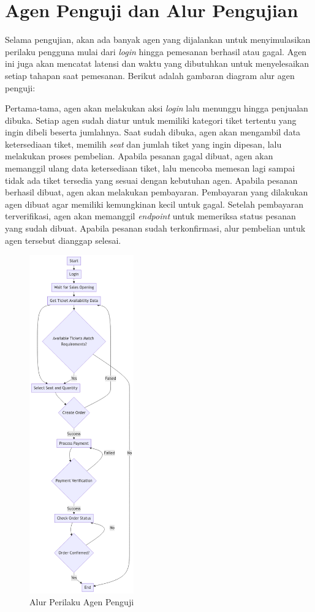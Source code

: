 \section{Agen Penguji dan Alur Pengujian}

Selama pengujian, akan ada banyak agen yang dijalankan untuk menyimulasikan perilaku pengguna mulai dari \textit{login} hingga pemesanan berhasil atau gagal. Agen ini juga akan mencatat latensi dan waktu yang dibutuhkan untuk menyelesaikan setiap tahapan saat pemesanan. Berikut adalah gambaran diagram alur agen penguji:

Pertama-tama, agen akan melakukan aksi \textit{login} lalu menunggu hingga penjualan dibuka. Setiap agen sudah diatur untuk memiliki kategori tiket tertentu yang ingin dibeli beserta jumlahnya. Saat sudah dibuka, agen akan mengambil data ketersediaan tiket, memilih \textit{seat} dan jumlah tiket yang ingin dipesan, lalu melakukan proses pembelian. Apabila pesanan gagal dibuat, agen akan memanggil ulang data ketersediaan tiket, lalu mencoba memesan lagi sampai tidak ada tiket tersedia yang sesuai dengan kebutuhan agen. Apabila pesanan berhasil dibuat, agen akan melakukan pembayaran. Pembayaran yang dilakukan agen dibuat agar memiliki kemungkinan kecil untuk gagal. Setelah pembayaran terverifikasi, agen akan memanggil \textit{endpoint} untuk memeriksa status pesanan yang sudah dibuat. Apabila pesanan sudah terkonfirmasi, alur pembelian untuk agen tersebut dianggap selesai.

\begin{figure}[htbp]
    \centering
    \includegraphics[width=0.4\textwidth]{resources/appendix/flow-agent.png}
    \caption{Alur Perilaku Agen Penguji}
    \label{fig:agent-flow}
\end{figure}